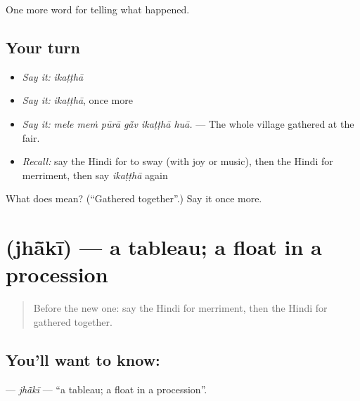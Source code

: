 \begin{grammarlens}[title={What you've built}]
One more word for telling what happened.
\end{grammarlens}

\subsection*{Your turn}
\begin{itemize}
\raggedright
  \item \emph{Say it:} \emph{ikaṭṭhā}
  \item \emph{Say it:} \emph{ikaṭṭhā}, once more
  \item \emph{Say it:} \emph{mele meṁ pūrā gā̃v ikaṭṭhā huā.} — The whole village gathered at the fair.
  \item \emph{Recall:} say the Hindi for to sway (with joy or music), then the Hindi for merriment, then say \emph{ikaṭṭhā} again
\end{itemize}

\begin{tcolorbox}[breakable,colback=teal!4,colframe=teal!35!black,title={Before you move on}]
What does  mean? (\textquotedblleft{}Gathered together\textquotedblright{}.) Say it once more.
\end{tcolorbox}
\section[\texorpdfstring{\hi{झाँकी} (jhā̃kī)}{झाँकी (jhā̃kī)}]{ (jhā̃kī) — a tableau; a float in a procession}

\label{lesson:HI-C330-jhaki}



\begin{quote}
Before the new one: say the Hindi for merriment, then the Hindi for gathered together.
\end{quote}

\subsection*{You'll want to know: }
\textbf{} — \emph{jhā̃kī} — \textquotedblleft{}a tableau; a float in a procession\textquotedblright{}.

\begin{quote}
       
\end{quote}

